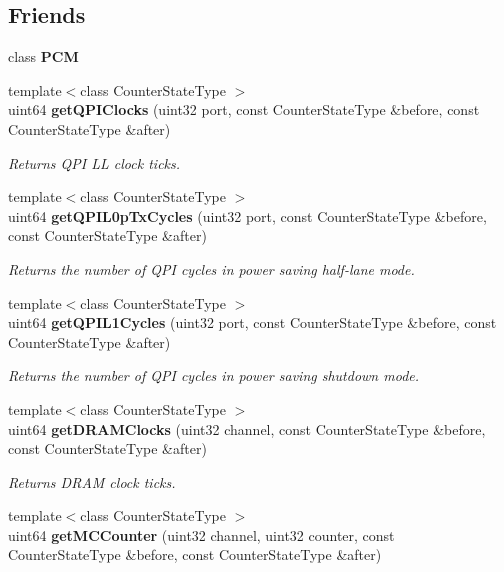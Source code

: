 \subsection*{Friends}
\begin{DoxyCompactItemize}
\item 
class {\bfseries P\+CM}\label{classServerUncorePowerState_ab5f56d2e95ba3daf52c17b8a1d356d64}

\item 
{\footnotesize template$<$class Counter\+State\+Type $>$ }\\uint64 {\bf get\+Q\+P\+I\+Clocks} (uint32 port, const Counter\+State\+Type \&before, const Counter\+State\+Type \&after)
\begin{DoxyCompactList}\small\item\em Returns Q\+PI LL clock ticks. \end{DoxyCompactList}\item 
{\footnotesize template$<$class Counter\+State\+Type $>$ }\\uint64 {\bf get\+Q\+P\+I\+L0p\+Tx\+Cycles} (uint32 port, const Counter\+State\+Type \&before, const Counter\+State\+Type \&after)
\begin{DoxyCompactList}\small\item\em Returns the number of Q\+PI cycles in power saving half-\/lane mode. \end{DoxyCompactList}\item 
{\footnotesize template$<$class Counter\+State\+Type $>$ }\\uint64 {\bf get\+Q\+P\+I\+L1\+Cycles} (uint32 port, const Counter\+State\+Type \&before, const Counter\+State\+Type \&after)
\begin{DoxyCompactList}\small\item\em Returns the number of Q\+PI cycles in power saving shutdown mode. \end{DoxyCompactList}\item 
{\footnotesize template$<$class Counter\+State\+Type $>$ }\\uint64 {\bf get\+D\+R\+A\+M\+Clocks} (uint32 channel, const Counter\+State\+Type \&before, const Counter\+State\+Type \&after)
\begin{DoxyCompactList}\small\item\em Returns D\+R\+AM clock ticks. \end{DoxyCompactList}\item 
{\footnotesize template$<$class Counter\+State\+Type $>$ }\\uint64 {\bf get\+M\+C\+Counter} (uint32 channel, uint32 counter, const Counter\+State\+Type \&before, const Counter\+State\+Type \&after)

\end{DoxyCompactItemize}

